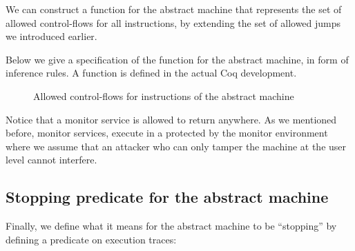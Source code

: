 We can construct a function  for the abstract machine
that represents the set of allowed control-flows for all
instructions, by extending the set of allowed jumps \CFG we
introduced earlier.

Below we give a specification of the  function for the abstract machine,
in form of inference rules. A function is defined in the actual Coq development.

\begin{figure}[ht]
\bigskip

\bigskip

\bigskip

\caption{Allowed control-flows for instructions of the abstract machine}
\end{figure}

Notice that a monitor service is allowed to return anywhere. As we
mentioned before, monitor services, execute in a protected by the
monitor environment where we assume that an attacker who can only
tamper the machine at the user level cannot interfere.

\subsection{Stopping predicate for the abstract machine}
\label{sec:abstract_stopping}

Finally, we define what it means for the abstract machine to be ``stopping'' by
defining a predicate on execution traces:

